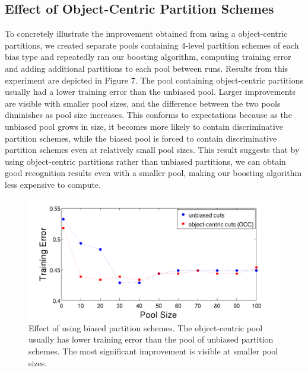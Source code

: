 \documentclass{bmvc2k}
\begin{document}
  

  \subsection{Effect of Object-Centric Partition Schemes}
  To concretely illustrate the improvement obtained from using a
  object-centric partitions, we created separate pools containing 4-level
  partition schemes of each bias type and
  repeatedly ran our boosting algorithm, computing training error and adding additional
  partitions to each pool between runs. Results from this experiment are
  depicted in Figure 7. The pool containing object-centric partitions 
  usually had a lower training error than the unbiased pool.
  Larger improvements are visible with smaller pool sizes, and the difference
  between the two pools diminishes as pool size increases. This conforms to
  expectations because as the unbiased pool grows in size, it becomes more
  likely to contain discriminative partition schemes, while the biased pool
  is forced to contain discriminative partition schemes even at relatively
  small pool sizes. This result suggests that by using object-centric
  partitions rather than unbiased partitions, we can obtain good recognition
  results even with a smaller pool, making our boosting algorithm less expensive
  to compute.
 
  \begin{figure}[t]
		\begin{center}
			  \includegraphics[width=1.0\linewidth]{figures/trainerror.png}
		\end{center}
		   \caption{Effect of using biased partition schemes. The object-centric
         pool
       usually has lower training error
       than the pool of unbiased partition schemes. The most significant
     improvement is visible at smaller pool sizes.}
				\label{fig:long}
				\label{fig:onecol}
	\end{figure}
  
\end{document}
